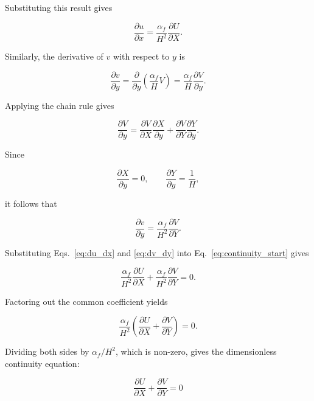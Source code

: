 \documentclass[preprint,3p,number]{elsarticle}
\begin{document}
Substituting this result gives

\begin{equation}
\frac{\partial u}{\partial x}
=
\frac{\alpha_f}{H^2}
\frac{\partial U}{\partial X}.
\label{eq:du_dx}
\end{equation}

Similarly, the derivative of \(v\) with respect to \(y\) is

\begin{equation}
\frac{\partial v}{\partial y}
=
\frac{\partial}{\partial y}
\left(\frac{\alpha_f}{H}V\right)
=
\frac{\alpha_f}{H}
\frac{\partial V}{\partial y}.
\end{equation}

Applying the chain rule gives

\begin{equation}
\frac{\partial V}{\partial y}
=
\frac{\partial V}{\partial X}
\frac{\partial X}{\partial y}
+
\frac{\partial V}{\partial Y}
\frac{\partial Y}{\partial y}.
\end{equation}

Since

\begin{equation}
\frac{\partial X}{\partial y}=0,
\qquad
\frac{\partial Y}{\partial y}=\frac{1}{H},
\end{equation}

it follows that

\begin{equation}
\frac{\partial v}{\partial y}
=
\frac{\alpha_f}{H^2}
\frac{\partial V}{\partial Y}.
\label{eq:dv_dy}
\end{equation}

Substituting Eqs.~\eqref{eq:du_dx} and \eqref{eq:dv_dy}
into Eq.~\eqref{eq:continuity_start} gives

\begin{equation}
\frac{\alpha_f}{H^2}
\frac{\partial U}{\partial X}
+
\frac{\alpha_f}{H^2}
\frac{\partial V}{\partial Y}
=0.
\end{equation}

Factoring out the common coefficient yields

\begin{equation}
\frac{\alpha_f}{H^2}
\left(
\frac{\partial U}{\partial X}
+
\frac{\partial V}{\partial Y}
\right)
=0.
\end{equation}

Dividing both sides by \(\alpha_f/H^2\), which is non-zero,
gives the dimensionless continuity equation:

\begin{equation}
\boxed{
\frac{\partial U}{\partial X}
+
\frac{\partial V}{\partial Y}
=0
}
\label{eq:continuity_dimensionless}
\end{equation}
\end{document}
